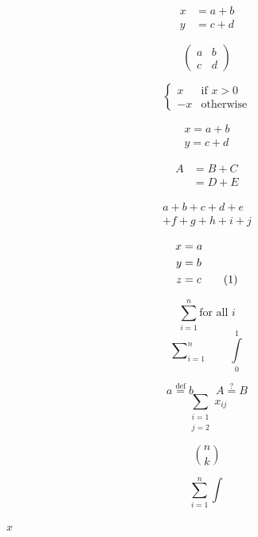 \documentclass{article}
\begin{document}
$$
  \begin{aligned}
    x & = a + b \\
    y & = c + d
  \end{aligned}
$$

$$
  \begin{pmatrix}
    a & b \\
    c & d
  \end{pmatrix}
$$

$$
  \begin{cases}
    x  & \text{if } x > 0 \\
    -x & \text{otherwise}
  \end{cases}
$$

\begin{equation}
  \begin{gathered}
    x = a + b \\ y = c + d
  \end{gathered}
\end{equation}

\begin{equation}
  \begin{split}
    A & = B + C \\
      & = D + E
  \end{split}
\end{equation}

\begin{multline}
  a + b + c + d + e \\
  + f + g + h + i + j
\end{multline}

\begin{align}
  x & = a \notag \\
  y & = b \nonumber \\
  z & = c \tag{1}
\end{align}

$$
  \sum_{i=1}^{n} \text{for all } i
$$
$$
  \sum\nolimits_{i=1}^{n} \qquad \int\limits_{0}^{1}
$$

$$
  a \stackrel{\text{def}}{=} b \qquad A \overset{?}{=} B
$$
$$
  \sum_{\substack{i=1 \\ j=2}} x_{ij}
$$

$$
  \binom{n}{k}
$$

$$
  \displaystyle \sum_{i=1}^{n} \textstyle \int
$$

\DeclareMathOperator{\diag}{diag}

\newcommand{\R}{\mathbb{R}}
\newcommand{\abs}[1]{\left|#1\right|}

\ensuremath{x}
\end{document}
